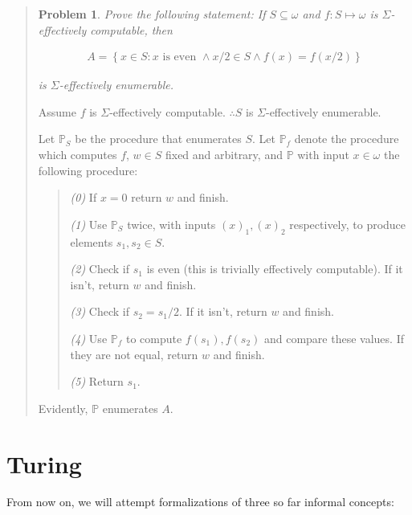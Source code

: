\documentclass[a4paper, 12pt]{article}
\newtheorem{problem}{Problem}
\newtheorem{problem}{Problem}
\begin{document}
\small
\begin{quote}



\begin{problem}
    Prove the following statement: If $S \subseteq \omega$ and $f : S \mapsto
    \omega$ is $\Sigma$-effectively computable, then 
    
    \begin{align*}
        A = \left\{ x \in  S : x \text{ is even } \land x / 2 \in S \land f(x) = f(x
        / 2) \right\} 
    \end{align*}

    is $\Sigma$-effectively enumerable.
\end{problem}

Assume $f$ is $\Sigma$-effectively computable.  $\therefore S$ is
$\Sigma$-effectively enumerable. 

Let $\mathbb{P}_S$ be the procedure that enumerates $S$. Let $\mathbb{P}_f$
denote the procedure which computes $f$, $w \in S$ fixed and arbitrary, and $\mathbb{P}$ with input $x \in
\omega$ the following
procedure: 

\begin{quote}

    \textit{(0)} If $x = 0$ return $w$ and finish. 

    \textit{(1)} Use $\mathbb{P}_S$ twice, with inputs $(x)_1, (x)_2$
    respectively, to produce elements $s_1, s_2 \in S$. 

    \textit{(2)} Check if $s_1$ is even (this is trivially effectively
    computable). If it isn't, return $w$ and finish. 

    \textit{(3)} Check if $s_2 = s_1 / 2 $. If it isn't, return $w$ and finish.

    \textit{(4)} Use $\mathbb{P}_f$ to compute $f(s_1), f(s_2)$ and compare
    these values. If they are not equal, return $w$ and finish. 

    \textit{(5)} Return $s_1$.
\end{quote}

Evidently, $\mathbb{P}$ enumerates $A$.


\end{quote}
\normalsize



\pagebreak
\section{Turing}

From now on, we will attempt formalizations of three so far informal concepts: 
\end{document}

